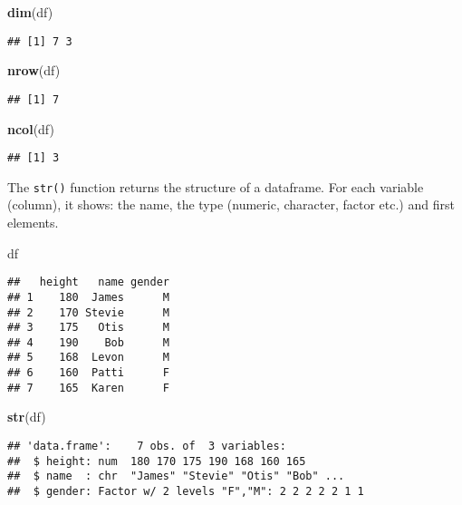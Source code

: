 \documentclass[]{book}
\newenvironment{Shaded}{\begin{snugshade}}{\end{snugshade}}
\newcommand{\KeywordTok}[1]{\textcolor[rgb]{0.13,0.29,0.53}{\textbf{{#1}}}}
\newcommand{\NormalTok}[1]{{#1}}
\begin{document}
\begin{Shaded}
\begin{Highlighting}[]
\KeywordTok{dim}\NormalTok{(df)}
\end{Highlighting}
\end{Shaded}

\begin{verbatim}
## [1] 7 3
\end{verbatim}

\begin{Shaded}
\begin{Highlighting}[]
\KeywordTok{nrow}\NormalTok{(df)}
\end{Highlighting}
\end{Shaded}

\begin{verbatim}
## [1] 7
\end{verbatim}

\begin{Shaded}
\begin{Highlighting}[]
\KeywordTok{ncol}\NormalTok{(df)}
\end{Highlighting}
\end{Shaded}

\begin{verbatim}
## [1] 3
\end{verbatim}

The \texttt{str()} function returns the structure of a dataframe. For
each variable (column), it shows: the name, the type (numeric,
character, factor etc.) and first elements.

\begin{Shaded}
\begin{Highlighting}[]
\NormalTok{df}
\end{Highlighting}
\end{Shaded}

\begin{verbatim}
##   height   name gender
## 1    180  James      M
## 2    170 Stevie      M
## 3    175   Otis      M
## 4    190    Bob      M
## 5    168  Levon      M
## 6    160  Patti      F
## 7    165  Karen      F
\end{verbatim}

\begin{Shaded}
\begin{Highlighting}[]
\KeywordTok{str}\NormalTok{(df)}
\end{Highlighting}
\end{Shaded}

\begin{verbatim}
## 'data.frame':    7 obs. of  3 variables:
##  $ height: num  180 170 175 190 168 160 165
##  $ name  : chr  "James" "Stevie" "Otis" "Bob" ...
##  $ gender: Factor w/ 2 levels "F","M": 2 2 2 2 2 1 1
\end{verbatim}
\end{document}
